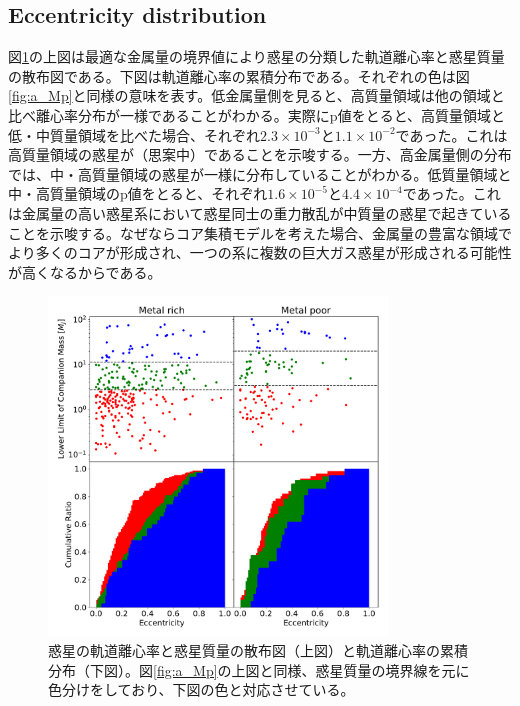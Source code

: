 \documentclass[twocolumn, dvipdfmx]{aastex62}
\begin{document}
\begin{CJK*}{UTF8}{min}
\subsection{Eccentricity distribution} \label{subsec:eccentricity}

図\ref{fig:e_Mp}の上図は最適な金属量の境界値により惑星の分類した軌道離心率と惑星質量の散布図である。下図は軌道離心率の累積分布である。それぞれの色は図\ref{fig:a_Mp}と同様の意味を表す。低金属量側を見ると、高質量領域は他の領域と比べ離心率分布が一様であることがわかる。実際にp値をとると、高質量領域と低・中質量領域を比べた場合、それぞれ$2.3\times10^{-3}$と$1.1\times10^{-2}$であった。これは高質量領域の惑星が（思案中）であることを示唆する。一方、高金属量側の分布では、中・高質量領域の惑星が一様に分布していることがわかる。低質量領域と中・高質量領域のp値をとると、それぞれ$1.6\times10^{-5}$と$4.4\times10^{-4}$であった。これは金属量の高い惑星系において惑星同士の重力散乱が中質量の惑星で起きていることを示唆する。なぜならコア集積モデルを考えた場合、金属量の豊富な領域でより多くのコアが形成され、一つの系に複数の巨大ガス惑星が形成される可能性が高くなるからである。

\begin{figure}[H]
\begin{center}
\includegraphics[width=9cm]{../../Figure/e_Mp_merge.pdf}
\caption{惑星の軌道離心率と惑星質量の散布図（上図）と軌道離心率の累積分布（下図）。図\ref{fig:a_Mp}の上図と同様、惑星質量の境界線を元に色分けをしており、下図の色と対応させている。\label{fig:e_Mp}}
\end{center}
\end{figure}


\acknowledgments


\vspace{5mm}



\end{CJK*}
\end{document}
